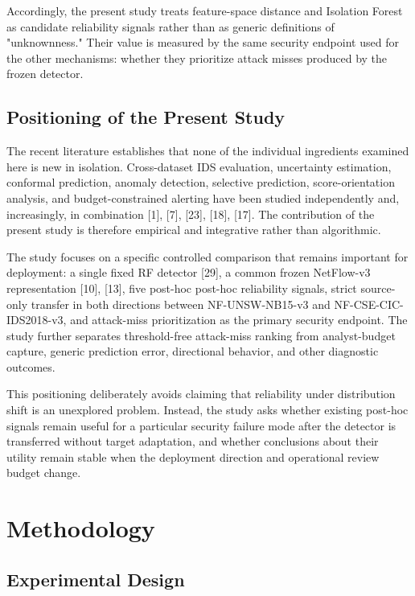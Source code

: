 \documentclass[conference]{IEEEtran}
\begin{document}
Accordingly, the present study treats feature-space distance and Isolation Forest as candidate reliability signals rather than as generic definitions of "unknownness." Their value is measured by the same security endpoint used for the other mechanisms: whether they prioritize attack misses produced by the frozen detector.

\subsection{Positioning of the Present Study}

The recent literature establishes that none of the individual ingredients examined here is new in isolation. Cross-dataset IDS evaluation, uncertainty estimation, conformal prediction, anomaly detection, selective prediction, score-orientation analysis, and budget-constrained alerting have been studied independently and, increasingly, in combination [1], [7], [23], [18], [17]. The contribution of the present study is therefore empirical and integrative rather than algorithmic.

The study focuses on a specific controlled comparison that remains important for deployment: a single fixed RF detector [29], a common frozen NetFlow-v3 representation [10], [13], five post-hoc post-hoc reliability signals, strict source-only transfer in both directions between NF-UNSW-NB15-v3 and NF-CSE-CIC-IDS2018-v3, and attack-miss prioritization as the primary security endpoint. The study further separates threshold-free attack-miss ranking from analyst-budget capture, generic prediction error, directional behavior, and other diagnostic outcomes.

This positioning deliberately avoids claiming that reliability under distribution shift is an unexplored problem. Instead, the study asks whether existing post-hoc signals remain useful for a particular security failure mode after the detector is transferred without target adaptation, and whether conclusions about their utility remain stable when the deployment direction and operational review budget change.

\section{Methodology}

\subsection{Experimental Design}
\end{document}

